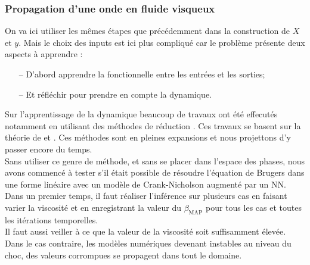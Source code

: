 \documentclass[a4paper,12pt]{article}
\newcommand{\bmap}{\beta_{\text{MAP}}}
\newcommand\bk{\color{black}}
\newcommand\dsb{\color{dsb}}
\numberwithin{equation}{section} %
\begin{document}
\dsb \subsubsection{Propagation d'une onde en fluide visqueux} \bk \label{burgerBIF}
\noindent On va ici utiliser les mêmes étapes que précédemment dans la construction de $X$ et $y$. Mais le choix des inputs est ici plus compliqué car le problème présente deux aspects à apprendre : 
\begin{itemize}[leftmargin=5mm]
\item[--] D'abord apprendre la fonctionnelle entre les entrées et les sorties;
\item[--] Et réfléchir pour prendre en compte la dynamique.
\end{itemize}   
Sur l'apprentissage de la dynamique beaucoup de travaux ont été effecutés notamment en utilisant des méthodes de réduction \citep{parish2016reduced}. Ces travaux se basent sur la théorie de \citep{chorin2002optimal} et \citep{tsung1995phase}. Ces méthodes sont en pleines expansions et nous projettons d'y passer encore du temps.\\

\noindent Sans utiliser ce genre de méthode, et sans se placer dans l'espace des phases, nous avons commencé à tester s'il était possible de résoudre l'équation de Brugers dans une forme linéaire avec un modèle de Crank-Nicholson augmenté par un NN.\\
Dans un premier temps, il faut réaliser l'inférence sur plusieurs cas en faisant varier la viscosité et en enregistrant la valeur du $\bmap$ pour tous les cas et toutes les itérations temporelles. \\
Il faut aussi veiller à ce que la valeur de la viscosité soit suffisamment élevée. Dans le cas contraire, les modèles numériques devenant instables au niveau du choc, des valeurs corrompues se propagent dans tout le domaine.\\
\end{document}
